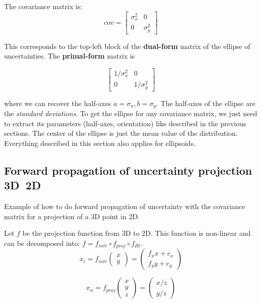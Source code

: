 The covariance matrix is:
\begin{equation}
    cov = \left[\begin{array}{cc}
        \sigma_x^2 & 0 \\
        0 & \sigma_y^2
    \end{array}\right]
\end{equation}

This corresponds to the top-left block of the \textbf{dual-form} matrix of the ellipse of uncertainties. The \textbf{primal-form} matrix is

\begin{equation}
    \left[\begin{array}{cc}
        1/\sigma_x^2 & 0 \\
        0 & 1/\sigma_y^2
    \end{array}\right]
\end{equation}

where we can recover the half-axes $a = \sigma_x, b = \sigma_y$.
The half-axes of the ellipse are the \textit{standard deviations}. To get the ellipse for any covariance matrix, we just need to extract its parameters (half-axes, orientation) like described in the previous sections. The center of the ellipse is just the mean value of the distribution. 
Everything described in this section also applies for ellipsoids.


\subsection{Forward propagation of uncertainty projection 3D~2D}
Example of how to do forward propagation of uncertainty with the covariance matrix for a projection of a 3D point in 2D.

Let $f$ be the projection function from 3D to 2D. This function is non-linear and can be decomposed into: $f = f_{intr} \circ f_{proj} \circ f_{Rt}$.
\begin{equation}
    x_i = f_{intr}\left(\begin{array}{c}
        x \\ y \end{array}\right) = 
        \left(\begin{array}{c}
            f_x x + c_x \\
            f_y y + c_y
        \end{array}\right)
\end{equation}

\begin{equation}
    x_n = f_{proj}\left(\begin{array}{c}
        x \\ y \\ z \end{array}\right) = 
        \left(\begin{array}{c}
            x / z \\ y / z
        \end{array}\right)
\end{equation}

